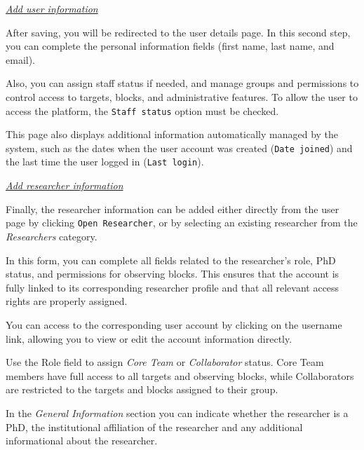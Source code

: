 
\newpage

\underline{\textsl{Add user information}}

After saving, you will be redirected to the user details page. In this second step, you can complete the personal information fields (first name, last name, and email).


Also, you can assign staff status if needed, and manage groups and permissions to control access to targets, blocks, and administrative features. To allow the user to access the platform, the \texttt{Staff status} option must be checked.


This page also displays additional information automatically managed by the system, such as the dates when the user account was created (\texttt{Date joined}) and the last time the user logged in (\texttt{Last login}).


\underline{\textsl{Add researcher information}}

Finally, the researcher information can be added either directly from the user page by clicking \texttt{Open Researcher}, or by selecting an existing researcher from the \textsl{Researchers} category. 

In this form, you can complete all fields related to the researcher’s role, PhD status, and permissions for observing blocks. This ensures that the account is fully linked to its corresponding researcher profile and that all relevant access rights are properly assigned. 

You can access to the corresponding user account by clicking on the username link, allowing you to view or edit the account information directly.

Use the Role field to assign \textsl{Core Team} or \textsl{Collaborator} status. Core Team members have full access to all targets and observing blocks, while Collaborators are restricted to the targets and blocks assigned to their group. 


In the \textsl{General Information} section you can indicate whether the researcher is a PhD, the institutional affiliation of the researcher and any additional informational about the researcher.

